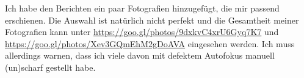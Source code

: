 Ich habe den Berichten ein paar Fotografien hinzugefügt, die mir
passend erschienen. Die Auswahl ist natürlich nicht perfekt und die
Gesamtheit meiner Fotografien kann unter
\url{https://goo.gl/photos/9dxkvC4xrU6Gyq7K7} und
\url{https://goo.gl/photos/Xev3GQmEhM2gDoAVA} eingesehen werden.  Ich
muss allerdings warnen, dass ich viele davon mit defektem Autofokus
manuell (un)scharf gestellt habe.


